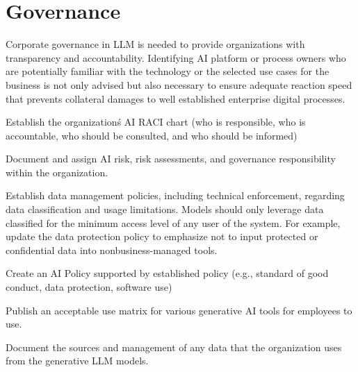 \section{Governance}
Corporate governance in LLM is needed to provide organizations with transparency
and accountability. Identifying AI platform or process owners who are
potentially familiar with the technology or the selected use cases for the
business is not only advised but also necessary to ensure adequate reaction
speed that prevents collateral damages to well established enterprise digital
processes.
\begin{minipage}{\linewidth}
\begin{checklist}
  \item Establish the organization\'s AI RACI chart (who is responsible, who is accountable, who should be consulted, and who should be informed)
  \item Document and assign AI risk, risk assessments, and governance responsibility within the organization.
  \item Establish data management policies, including technical enforcement, regarding data classification and usage limitations. Models should only leverage data classified for the minimum access level of any user of the system. For example, update the data protection policy to emphasize not to input protected or confidential data into nonbusiness-managed tools.
  \item Create an AI Policy supported by established policy (e.g., standard of good conduct, data protection, software use)
  \item Publish an acceptable use matrix for various generative AI tools for employees to use.
  \item Document the sources and management of any data that the organization uses from the generative LLM models.
\end{checklist}
\end{minipage}

